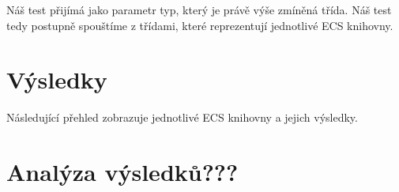 Náš test přijímá jako parametr typ, který je právě výše zmíněná třída. Náš test tedy postupně spouštíme z třídami, které reprezentují jednotlivé ECS knihovny.

\section{Výsledky}
Následující přehled zobrazuje jednotlivé ECS knihovny a jejich výsledky.


\section{Analýza výsledků???}

















